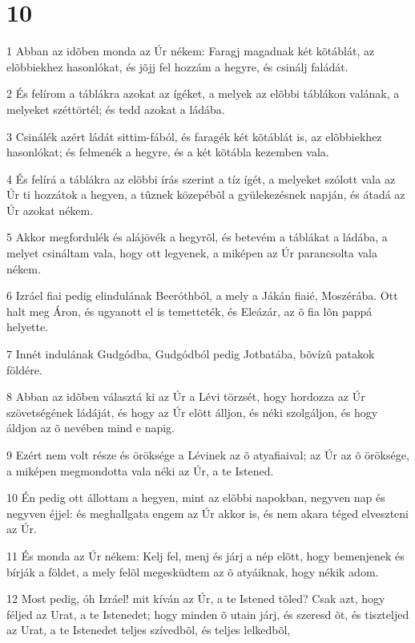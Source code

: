 \chapter{10}

\par 1 Abban az idõben monda az Úr nékem: Faragj magadnak két kõtáblát, az elõbbiekhez hasonlókat, és jõjj fel hozzám a hegyre, és csinálj  faládát.
\par 2 És felírom a táblákra azokat az ígéket, a melyek az elõbbi táblákon valának, a melyeket széttörtél; és tedd azokat a ládába.
\par 3 Csinálék azért ládát sittim-fából, és faragék két kõtáblát is, az elõbbiekhez hasonlókat; és felmenék a hegyre, és a két kõtábla kezemben vala.
\par 4 És felírá a táblákra az elõbbi írás szerint a tíz ígét, a melyeket szólott vala az Úr ti hozzátok a hegyen, a tûznek közepébõl a gyülekezésnek napján, és átadá az Úr azokat nékem.
\par 5 Akkor megfordulék és alájövék a hegyrõl, és betevém a táblákat a ládába, a melyet csináltam vala, hogy ott legyenek, a miképen az Úr parancsolta vala nékem.
\par 6 Izráel fiai pedig elindulának Beeróthból, a mely a Jákán fiaié, Moszérába. Ott  halt meg Áron, és ugyanott el is temetteték, és Eleázár, az õ fia lõn pappá helyette.
\par 7 Innét indulának Gudgódba, Gudgódból pedig Jotbatába, bõvízû patakok földére.
\par 8 Abban az idõben választá ki az Úr a Lévi törzsét, hogy hordozza az Úr szövetségének ládáját, és hogy az Úr elõtt álljon, és néki szolgáljon, és hogy áldjon az õ nevében mind e napig.
\par 9 Ezért nem volt része és öröksége a Lévinek az õ atyafiaival; az Úr az õ öröksége, a miképen megmondotta vala néki az Úr, a te Istened.
\par 10 Én pedig ott állottam a hegyen, mint az elõbbi napokban, negyven nap és negyven éjjel: és meghallgata engem az Úr akkor is, és nem akara téged elveszteni az Úr.
\par 11 És monda az Úr nékem: Kelj fel, menj és járj a nép elõtt, hogy bemenjenek és bírják a földet, a mely felõl megesküdtem az õ atyáiknak, hogy nékik adom.
\par 12 Most pedig, óh Izráel! mit kíván az Úr, a te Istened tõled? Csak azt, hogy féljed az Urat, a te Istenedet; hogy minden õ utain járj, és szeresd õt, és tiszteljed az Urat, a te Istenedet teljes szívedbõl, és teljes lelkedbõl,
